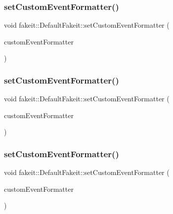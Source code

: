 \subsubsection{\texorpdfstring{setCustomEventFormatter()}{setCustomEventFormatter()}\hspace{0.1cm}{\footnotesize\ttfamily [7/9]}}
{\footnotesize\ttfamily void fakeit\+::\+Default\+Fakeit\+::set\+Custom\+Event\+Formatter (\begin{DoxyParamCaption}\item[{\mbox{\hyperlink{structfakeit_1_1EventFormatter}{fakeit\+::\+Event\+Formatter}} \&}]{custom\+Event\+Formatter }\end{DoxyParamCaption})\hspace{0.3cm}{\ttfamily [inline]}}

\mbox{\label{classfakeit_1_1DefaultFakeit_acd1e573c131e25862030cec8cf223035}} 
\subsubsection{\texorpdfstring{setCustomEventFormatter()}{setCustomEventFormatter()}\hspace{0.1cm}{\footnotesize\ttfamily [8/9]}}
{\footnotesize\ttfamily void fakeit\+::\+Default\+Fakeit\+::set\+Custom\+Event\+Formatter (\begin{DoxyParamCaption}\item[{\mbox{\hyperlink{structfakeit_1_1EventFormatter}{fakeit\+::\+Event\+Formatter}} \&}]{custom\+Event\+Formatter }\end{DoxyParamCaption})\hspace{0.3cm}{\ttfamily [inline]}}

\mbox{\label{classfakeit_1_1DefaultFakeit_acd1e573c131e25862030cec8cf223035}} 
\subsubsection{\texorpdfstring{setCustomEventFormatter()}{setCustomEventFormatter()}\hspace{0.1cm}{\footnotesize\ttfamily [9/9]}}
{\footnotesize\ttfamily void fakeit\+::\+Default\+Fakeit\+::set\+Custom\+Event\+Formatter (\begin{DoxyParamCaption}\item[{\mbox{\hyperlink{structfakeit_1_1EventFormatter}{fakeit\+::\+Event\+Formatter}} \&}]{custom\+Event\+Formatter }\end{DoxyParamCaption})\hspace{0.3cm}{\ttfamily [inline]}}

